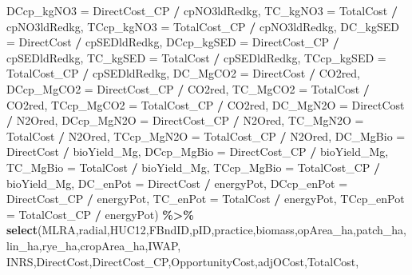 \documentclass[
]{article}
\newenvironment{Shaded}{\begin{snugshade}}{\end{snugshade}}
\newcommand{\AttributeTok}[1]{\textcolor[rgb]{0.13,0.29,0.53}{#1}}
\newcommand{\FunctionTok}[1]{\textcolor[rgb]{0.13,0.29,0.53}{\textbf{#1}}}
\newcommand{\NormalTok}[1]{#1}
\newcommand{\SpecialCharTok}[1]{\textcolor[rgb]{0.81,0.36,0.00}{\textbf{#1}}}
\begin{document}
\begin{Shaded}
\begin{Highlighting}[]
         \AttributeTok{DCcp\_kgNO3 =}\NormalTok{ DirectCost\_CP }\SpecialCharTok{/}\NormalTok{ cpNO3ldRedkg,}
         \AttributeTok{TC\_kgNO3 =}\NormalTok{ TotalCost }\SpecialCharTok{/}\NormalTok{ cpNO3ldRedkg,}
         \AttributeTok{TCcp\_kgNO3 =}\NormalTok{ TotalCost\_CP }\SpecialCharTok{/}\NormalTok{ cpNO3ldRedkg,}
         \AttributeTok{DC\_kgSED =}\NormalTok{ DirectCost }\SpecialCharTok{/}\NormalTok{ cpSEDldRedkg,}
         \AttributeTok{DCcp\_kgSED =}\NormalTok{ DirectCost\_CP }\SpecialCharTok{/}\NormalTok{ cpSEDldRedkg,}
         \AttributeTok{TC\_kgSED =}\NormalTok{ TotalCost }\SpecialCharTok{/}\NormalTok{ cpSEDldRedkg,}
         \AttributeTok{TCcp\_kgSED =}\NormalTok{ TotalCost\_CP }\SpecialCharTok{/}\NormalTok{ cpSEDldRedkg,}
         \AttributeTok{DC\_MgCO2 =}\NormalTok{ DirectCost }\SpecialCharTok{/}\NormalTok{ CO2red,}
         \AttributeTok{DCcp\_MgCO2 =}\NormalTok{ DirectCost\_CP }\SpecialCharTok{/}\NormalTok{ CO2red,}
         \AttributeTok{TC\_MgCO2 =}\NormalTok{ TotalCost }\SpecialCharTok{/}\NormalTok{ CO2red,}
         \AttributeTok{TCcp\_MgCO2 =}\NormalTok{ TotalCost\_CP }\SpecialCharTok{/}\NormalTok{ CO2red,}
         \AttributeTok{DC\_MgN2O =}\NormalTok{ DirectCost }\SpecialCharTok{/}\NormalTok{ N2Ored,}
         \AttributeTok{DCcp\_MgN2O =}\NormalTok{ DirectCost\_CP }\SpecialCharTok{/}\NormalTok{ N2Ored,}
         \AttributeTok{TC\_MgN2O =}\NormalTok{ TotalCost }\SpecialCharTok{/}\NormalTok{ N2Ored,}
         \AttributeTok{TCcp\_MgN2O =}\NormalTok{ TotalCost\_CP }\SpecialCharTok{/}\NormalTok{ N2Ored,}
         \AttributeTok{DC\_MgBio =}\NormalTok{ DirectCost }\SpecialCharTok{/}\NormalTok{ bioYield\_Mg,}
         \AttributeTok{DCcp\_MgBio =}\NormalTok{ DirectCost\_CP }\SpecialCharTok{/}\NormalTok{ bioYield\_Mg,}
         \AttributeTok{TC\_MgBio =}\NormalTok{ TotalCost }\SpecialCharTok{/}\NormalTok{ bioYield\_Mg,}
         \AttributeTok{TCcp\_MgBio =}\NormalTok{ TotalCost\_CP }\SpecialCharTok{/}\NormalTok{ bioYield\_Mg,}
         \AttributeTok{DC\_enPot =}\NormalTok{ DirectCost }\SpecialCharTok{/}\NormalTok{ energyPot,}
         \AttributeTok{DCcp\_enPot =}\NormalTok{ DirectCost\_CP }\SpecialCharTok{/}\NormalTok{ energyPot,}
         \AttributeTok{TC\_enPot =}\NormalTok{ TotalCost }\SpecialCharTok{/}\NormalTok{ energyPot,}
         \AttributeTok{TCcp\_enPot =}\NormalTok{ TotalCost\_CP }\SpecialCharTok{/}\NormalTok{ energyPot) }\SpecialCharTok{\%\textgreater{}\%}
  \FunctionTok{select}\NormalTok{(MLRA,radial,HUC12,FBndID,pID,practice,biomass,opArea\_ha,patch\_ha,}
\NormalTok{         lin\_ha,rye\_ha,cropArea\_ha,IWAP,}
\NormalTok{         INRS,DirectCost,DirectCost\_CP,OpportunityCost,adjOCost,TotalCost,}

\end{Highlighting}
\end{Shaded}
\end{document}
